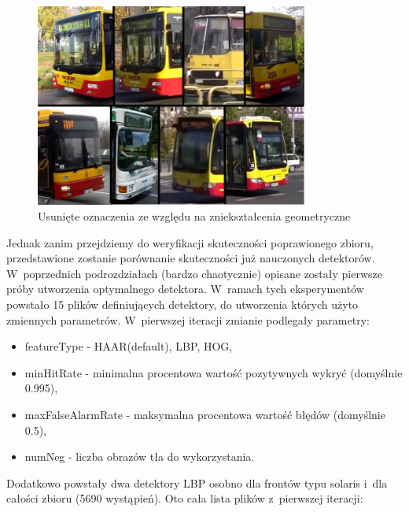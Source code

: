 \begin{figure}[h!]
    \centering
    \includegraphics[width=0.8\textwidth]{img/exp_removed_distorted_fronts}
    \caption{Usunięte oznaczenia ze względu na zniekształcenia geometryczne}
\end{figure}

Jednak zanim przejdziemy do weryfikacji skuteczności poprawionego
zbioru, przedstawione zostanie porównanie skuteczności już nauczonych
detektorów. W~poprzednich podrozdziałach (bardzo chaotycznie) opisane
zostały pierwsze próby utworzenia optymalnego detektora. W~ramach
tych eksperymentów powstało 15 plików definiujących detektory, do utworzenia
których użyto zmiennych parametrów. W~pierwszej iteracji zmianie podlegały
parametry:

\begin{itemize}
\item featureType - HAAR(default), LBP, HOG,
\item minHitRate - minimalna procentowa wartość pozytywnych wykryć (domyślnie 0.995),
\item maxFalseAlarmRate - maksymalna procentowa wartość błędów (domyślnie 0.5),
\item numNeg - liczba obrazów tła do wykorzystania.
\end{itemize}

Dodatkowo powstały dwa detektory LBP osobno dla frontów typu solaris i~dla
całości zbioru (5690 wystąpień). Oto cała lista plików z~pierwszej iteracji:


